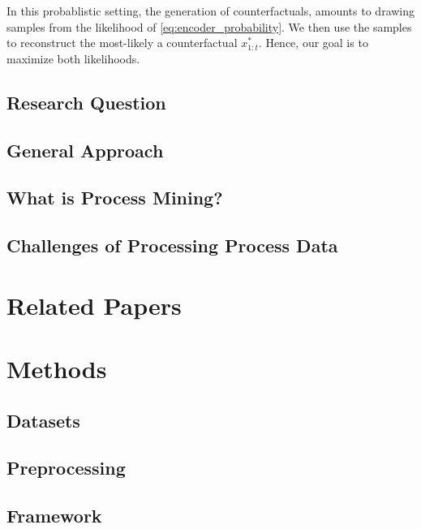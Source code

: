 \documentclass[12pt,a4paper]{report}
\begin{document}
In this probablistic setting, the generation of counterfactuals, amounts to drawing samples from the likelihood of \autoref{eq:encoder_probability}. We then use the samples to reconstruct the most-likely a counterfactual $x_{1:t}^*$. Hence, our goal is to maximize both likelihoods. 


\section{Research Question}

\section{General Approach}

\section{What is Process Mining?}

\section{Challenges of Processing Process Data}

\chapter{Related Papers}


\chapter{Methods}
\label{sec:methods}

\section{Datasets}
\label{sec:datasets}

\section{Preprocessing}
\label{sec:preprocessing}

\section{Framework}
\end{document}
